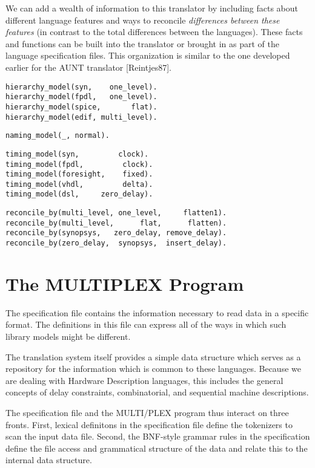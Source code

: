 We can add a wealth of information to this translator
by including facts about different language features
and ways to reconcile {\it differences between these features}
(in contrast to the total differences between the languages).
These facts and functions can be built into the
translator or brought in as part of the language 
specification files. This organization is similar to the
one developed earlier for the AUNT translator [Reintjes87].

\begin{verbatim}
hierarchy_model(syn,    one_level).
hierarchy_model(fpdl,   one_level).
hierarchy_model(spice,       flat).
hierarchy_model(edif, multi_level).
\end{verbatim}

\begin{verbatim}
naming_model(_, normal).
\end{verbatim}


\begin{verbatim}
timing_model(syn,         clock).
timing_model(fpdl,         clock).
timing_model(foresight,    fixed).
timing_model(vhdl,         delta).
timing_model(dsl,     zero_delay).
\end{verbatim}


\begin{verbatim}
reconcile_by(multi_level, one_level,     flatten1).
reconcile_by(multi_level,      flat,      flatten).
reconcile_by(synopsys,   zero_delay, remove_delay).
reconcile_by(zero_delay,  synopsys,  insert_delay).
\end{verbatim}

\section{The MULTIPLEX Program}

The specification file contains the information necessary
to read data in a specific format.
The definitions in this file can express all of the
ways in which such library models might be different.

The translation system itself provides a simple
data structure which serves as a repository for the
information which is common to these languages. Because
we are dealing with Hardware Description languages,
this includes the general concepts of delay constraints,
combinatorial, and sequential machine descriptions.

The specification file and the MULTI/PLEX program thus
interact on three fronts. First, lexical definitons
in the specification file define the tokenizers to
scan the input data file. Second, the BNF-style
grammar rules in the specification define the
file access and grammatical structure of the data
and relate this to the internal data structure.

